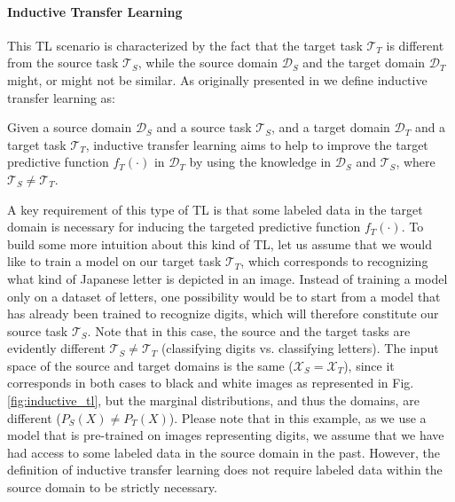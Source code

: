 \paragraph{\textbf{\uppercase{I}nductive \uppercase{T}ransfer \uppercase{L}earning}}
This TL scenario is characterized by the fact that the target task $\mathcal{T}_T$ is different from the source task $\mathcal{T}_S$, while the source domain $\mathcal{D}_S$ and the target domain $\mathcal{D}_T$ might, or might not be similar. As originally presented in \cite{pan2009survey} we define inductive transfer learning as:
\begin{definition}
	Given a source domain $\mathcal{D}_S$ and a source task $\mathcal{T}_S$, and a target domain $\mathcal{D}_T$ and a target task $\mathcal{T}_T$, inductive transfer learning aims to help to improve the target predictive function $f_T(\cdot)$ in $\mathcal{D}_T$ by using the knowledge in $\mathcal{D}_S$ and $\mathcal{T}_S$, where $\mathcal{T}_S \neq \mathcal{T}_T$. 
\end{definition}
A key requirement of this type of TL is that some labeled data in the target domain is necessary for inducing the targeted predictive function $f_T(\cdot)$. To build some more intuition about this kind of TL, let us assume that we would like to train a model on our target task $\mathcal{T}_T$, which corresponds to recognizing what kind of Japanese letter is depicted in an image. Instead of training a model only on a dataset of letters, one possibility would be to start from a model that has already been trained to recognize digits, which will therefore constitute our source task $\mathcal{T}_S$. Note that in this case, the source and the target tasks are evidently different $\mathcal{T}_S \neq \mathcal{T}_T$ (classifying digits vs. classifying letters). The input space of the source and target domains is the same ($\mathcal{X}_S = \mathcal{X}_T$), since it corresponds in both cases to black and white images as represented in Fig. \ref{fig:inductive_tl}, but the marginal distributions, and thus the domains, are different ($P_S(X)\neq P_T(X)$). Please note that in this example, as we use a model that is pre-trained on images representing digits, we assume that we have had access to some labeled data in the source domain in the past. However, the definition of inductive transfer learning does not require labeled data within the source domain to be strictly necessary.

